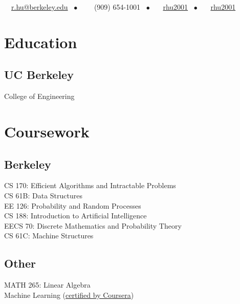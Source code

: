 \documentclass[]{deedy-resume-openfont}
\begin{document}
%
%
{\faEnvelope \ \ \href{mailto:r.hu@berkeley.edu}{r.hu@berkeley.edu} \ \(\bullet\) \ \ \faPhone \ \ (909)  654-1001 \ \(\bullet\) \ \faGithub \ \ \href{https://github.com/rhu2001}{rhu2001} \ \(\bullet\) \ \faLinkedin \ \ \href{https://www.linkedin.com/in/rhu2001/}{rhu2001}}

%
%

\begin{minipage}[t]{0.33\textwidth} 


\section{Education} 

\subsection{UC Berkeley}
College of Engineering \\


\section{Coursework}

\subsection{Berkeley}
CS 170: Efficient Algorithms and Intractable Problems \\
CS 61B: Data Structures \\
EE 126: Probability and Random Processes \\
CS 188: Introduction to Artificial Intelligence \\
EECS 70: Discrete Mathematics and Probability Theory \\
CS 61C: Machine Structures \\
\subsection{Other}
MATH 265: Linear Algebra \\
Machine Learning (\href{https://coursera.org/share/f28a9bb54a4cca7c445539ba73aa3d48}{certified by Coursera})


\end{minipage}
\end{document}

